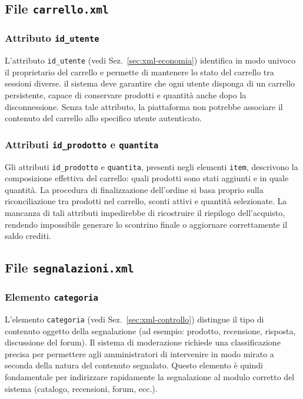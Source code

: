 \documentclass[a4paper,12pt]{report}
\begin{document}
\subsection{File \texttt{carrello.xml}}

\subsubsection*{Attributo \texttt{id\_utente}}
L’attributo \texttt{id\_utente} (vedi Sez.~\ref{sec:xml-economia}) identifica in modo univoco il proprietario del carrello e 
permette di mantenere lo stato del carrello tra sessioni diverse.  
il sistema deve garantire che ogni utente disponga di un carrello persistente, capace di conservare prodotti e quantità 
anche dopo la disconnessione.  
Senza tale attributo, la piattaforma non potrebbe associare il contenuto del carrello allo 
specifico utente autenticato.

\subsubsection*{Attributi \texttt{id\_prodotto} e \texttt{quantita}}
Gli attributi \texttt{id\_prodotto} e \texttt{quantita}, presenti negli elementi \texttt{item},
descrivono la composizione effettiva del carrello: quali prodotti sono stati aggiunti e in quale quantità.  
La procedura di finalizzazione 
dell’ordine si basa proprio sulla riconciliazione tra prodotti nel carrello, sconti attivi e 
quantità selezionate.  
La mancanza di tali attributi impedirebbe di ricostruire il riepilogo dell’acquisto,
rendendo impossibile generare lo scontrino finale o aggiornare correttamente il saldo crediti.

\subsection{File \texttt{segnalazioni.xml}}

\subsubsection*{Elemento \texttt{categoria}}
L’elemento \texttt{categoria} (vedi Sez.~\ref{sec:xml-controllo}) distingue il tipo di contenuto oggetto della segnalazione
(ad esempio: prodotto, recensione, risposta, discussione del forum).  
Il sistema di moderazione richiede una classificazione precisa per permettere agli amministratori di intervenire 
in modo mirato a seconda della natura del contenuto segnalato.  
Questo elemento è quindi fondamentale per indirizzare rapidamente la segnalazione al modulo corretto del sistema (catalogo, recensioni, forum, ecc.).
\end{document}
